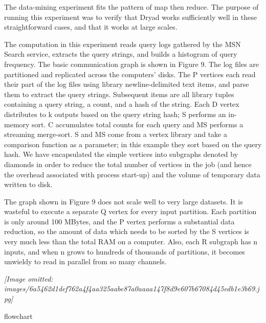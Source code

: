 \documentclass[
]{article}
\begin{document}
The data-mining experiment fits the pattern of map then reduce. The
purpose of running this experiment was to verify that Dryad works
sufficiently well in these straightforward cases, and that it works at
large scales.

The computation in this experiment reads query logs gathered by the MSN
Search service, extracts the query strings, and builds a histogram of
query frequency. The basic communication graph is shown in Figure 9. The
log files are partitioned and replicated across the computers' disks.
The P vertices each read their part of the log files using library
newline-delimited text items, and parse them to extract the query
strings. Subsequent items are all library tuples containing a query
string, a count, and a hash of the string. Each D vertex distributes to
k outputs based on the query string hash; S performs an in-memory sort.
C accumulates total counts for each query and MS performs a streaming
merge-sort. S and MS come from a vertex library and take a comparison
function as a parameter; in this example they sort based on the query
hash. We have encapsulated the simple vertices into subgraphs denoted by
diamonds in order to reduce the total number of vertices in the job (and
hence the overhead associated with process start-up) and the volume of
temporary data written to disk.

The graph shown in Figure 9 does not scale well to very large datasets.
It is wasteful to execute a separate Q vertex for every input partition.
Each partition is only around 100 MBytes, and the P vertex performs a
substantial data reduction, so the amount of data which needs to be
sorted by the S vertices is very much less than the total RAM on a
computer. Also, each R subgraph has n inputs, and when n grows to
hundreds of thousands of partitions, it becomes unwieldy to read in
parallel from so many channels.

\textit{[Image omitted: images/6a5462d1def762a4f4aa325aabe87a0aaaa147f8d9e607b67084d45edb1e3b69.jpg]}

flowchart
\end{document}
